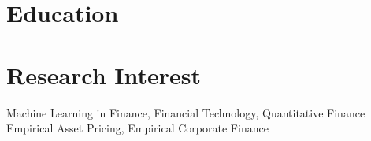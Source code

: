 \documentclass{clean_cv}
\begin{document}
\section{Education}

\begin{datetabular}{9em}


\end{datetabular}

\section{Research Interest}
\begin{center}
	Machine Learning in Finance, Financial Technology, Quantitative Finance\\ 
	Empirical Asset Pricing, Empirical Corporate Finance
\end{center}

%
\end{document}
